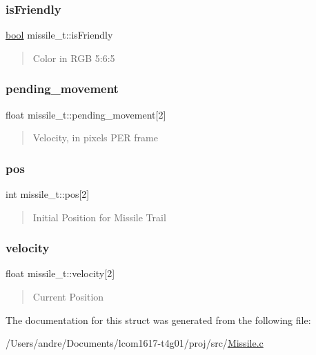 \subsubsection{\texorpdfstring{is\+Friendly}{isFriendly}}
{\footnotesize\ttfamily \hyperlink{_missile_8c_af6a258d8f3ee5206d682d799316314b1}{bool} missile\+\_\+t\+::is\+Friendly}



\begin{quote}
Color in R\+GB 5\+:6\+:5 \end{quote}


\hypertarget{structmissile__t_ad8c173c28c4adbf4b25292f0d2ea6a82}{}\label{structmissile__t_ad8c173c28c4adbf4b25292f0d2ea6a82} 
\subsubsection{\texorpdfstring{pending\+\_\+movement}{pending\_movement}}
{\footnotesize\ttfamily float missile\+\_\+t\+::pending\+\_\+movement\mbox{[}2\mbox{]}}



\begin{quote}
Velocity, in pixels P\+ER frame \end{quote}


\hypertarget{structmissile__t_acad3785ef3162b36ea58106e7cac3d3c}{}\label{structmissile__t_acad3785ef3162b36ea58106e7cac3d3c} 
\subsubsection{\texorpdfstring{pos}{pos}}
{\footnotesize\ttfamily int missile\+\_\+t\+::pos\mbox{[}2\mbox{]}}



\begin{quote}
Initial Position for Missile Trail \end{quote}


\hypertarget{structmissile__t_a33888390438f5edf647bf8ddf7ebd646}{}\label{structmissile__t_a33888390438f5edf647bf8ddf7ebd646} 
\subsubsection{\texorpdfstring{velocity}{velocity}}
{\footnotesize\ttfamily float missile\+\_\+t\+::velocity\mbox{[}2\mbox{]}}



\begin{quote}
Current Position \end{quote}




The documentation for this struct was generated from the following file\+:\begin{DoxyCompactItemize}
\item 
/\+Users/andre/\+Documents/lcom1617-\/t4g01/proj/src/\hyperlink{_missile_8c}{Missile.\+c}\end{DoxyCompactItemize}
